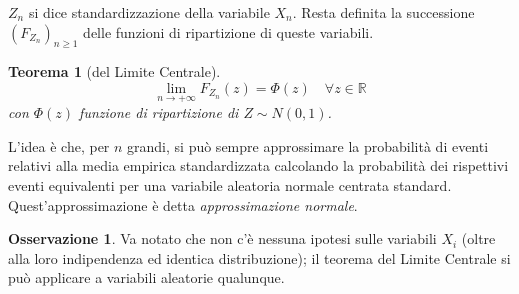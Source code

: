 \documentclass{article}
\theoremstyle{plain}
\newtheorem{teorema}{Teorema}[section]
\theoremstyle{definition}
\newtheorem{osservazione}{Osservazione}[section]
\theoremstyle{remark}
\begin{document}
$Z_n$ si dice standardizzazione della variabile $X_n$. Resta definita la successione $(F_{Z_n})_{n\geq1}$ delle funzioni di ripartizione di queste variabili.
\begin{teorema}[del Limite Centrale]
	\begin{equation*}
		\lim_{n\to+\infty}F_{Z_n}(z)=\Phi(z)\quad\forall z\in\mathds{R}
	\end{equation*}
	con $\Phi(z)$ funzione di ripartizione di $Z\sim N(0,1)$.
\end{teorema}
L'idea è che, per $n$ grandi, si può sempre approssimare la probabilità di eventi relativi alla media empirica standardizzata calcolando la probabilità dei rispettivi eventi equivalenti per una variabile aleatoria normale centrata standard. Quest'approssimazione è detta \textit{approssimazione normale}.
\begin{osservazione}
	Va notato che non c'è nessuna ipotesi sulle variabili $X_i$ (oltre alla loro indipendenza ed identica distribuzione); il teorema del Limite Centrale si può applicare a variabili aleatorie qualunque.
\end{osservazione}
\end{document}
